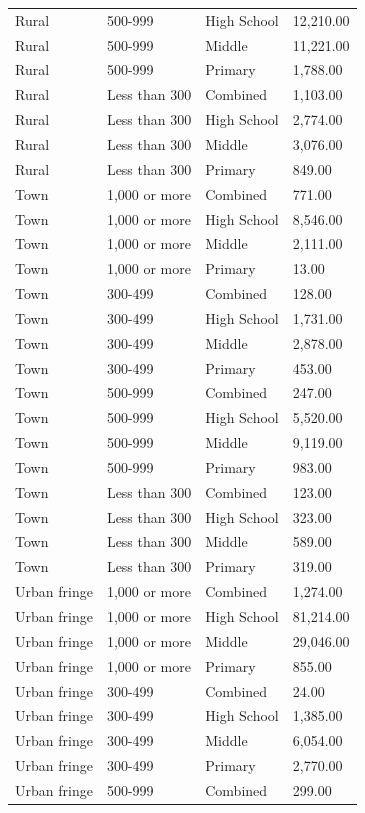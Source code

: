 \documentclass[
  man, fleqn, noextraspace]{apa6}
\begin{document}
\begin{table}[tbp]
\begin{center}
\begin{threeparttable}
\begin{tabular}{llll}
Rural & 500-999 & High School & 12,210.00\\
Rural & 500-999 & Middle & 11,221.00\\
Rural & 500-999 & Primary & 1,788.00\\
Rural & Less than 300 & Combined & 1,103.00\\
Rural & Less than 300 & High School & 2,774.00\\
Rural & Less than 300 & Middle & 3,076.00\\
Rural & Less than 300 & Primary & 849.00\\
Town & 1,000 or more & Combined & 771.00\\
Town & 1,000 or more & High School & 8,546.00\\
Town & 1,000 or more & Middle & 2,111.00\\
Town & 1,000 or more & Primary & 13.00\\
Town & 300-499 & Combined & 128.00\\
Town & 300-499 & High School & 1,731.00\\
Town & 300-499 & Middle & 2,878.00\\
Town & 300-499 & Primary & 453.00\\
Town & 500-999 & Combined & 247.00\\
Town & 500-999 & High School & 5,520.00\\
Town & 500-999 & Middle & 9,119.00\\
Town & 500-999 & Primary & 983.00\\
Town & Less than 300 & Combined & 123.00\\
Town & Less than 300 & High School & 323.00\\
Town & Less than 300 & Middle & 589.00\\
Town & Less than 300 & Primary & 319.00\\
Urban fringe & 1,000 or more & Combined & 1,274.00\\
Urban fringe & 1,000 or more & High School & 81,214.00\\
Urban fringe & 1,000 or more & Middle & 29,046.00\\
Urban fringe & 1,000 or more & Primary & 855.00\\
Urban fringe & 300-499 & Combined & 24.00\\
Urban fringe & 300-499 & High School & 1,385.00\\
Urban fringe & 300-499 & Middle & 6,054.00\\
Urban fringe & 300-499 & Primary & 2,770.00\\
Urban fringe & 500-999 & Combined & 299.00\\

\end{tabular}
\end{threeparttable}
\end{center}
\end{table}
\end{document}
